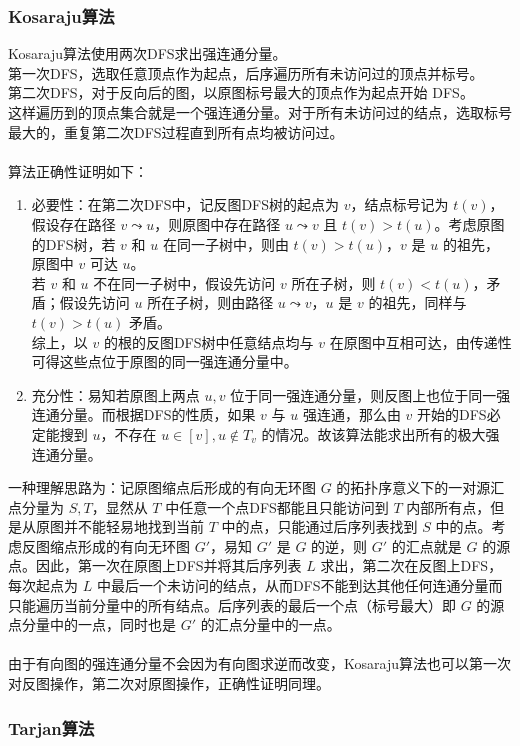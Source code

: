 \documentclass[12pt,a4paper]{article}
\begin{document}
\subsubsection{Kosaraju算法}
Kosaraju算法使用两次DFS求出强连通分量。\\
第一次DFS，选取任意顶点作为起点，后序遍历所有未访问过的顶点并标号。\\
第二次DFS，对于反向后的图，以原图标号最大的顶点作为起点开始 DFS。\\
这样遍历到的顶点集合就是一个强连通分量。对于所有未访问过的结点，选取标号最大的，重复第二次DFS过程直到所有点均被访问过。\\\\
算法正确性证明如下：
\begin{enumerate}
	\item 必要性：在第二次DFS中，记反图DFS树的起点为 $v$，结点标号记为 $t(v)$，假设存在路径 $v\leadsto u$，则原图中存在路径 $u\leadsto v$ 且 $t(v)>t(u)$。考虑原图的DFS树，若 $v$ 和 $u$ 在同一子树中，则由 $t(v)>t(u)$，$v$ 是 $u$ 的祖先，原图中 $v$ 可达 $u$。\\
	若 $v$ 和 $u$ 不在同一子树中，假设先访问 $v$ 所在子树，则 $t(v)<t(u)$，矛盾；假设先访问 $u$ 所在子树，则由路径 $u\leadsto v$，$u$ 是 $v$ 的祖先，同样与 $t(v)>t(u)$ 矛盾。\\
	综上，以 $v$ 的根的反图DFS树中任意结点均与 $v$ 在原图中互相可达，由传递性可得这些点位于原图的同一强连通分量中。
	\item 充分性：易知若原图上两点 $u,v$ 位于同一强连通分量，则反图上也位于同一强连通分量。而根据DFS的性质，如果 $v$ 与 $u$ 强连通，那么由 $v$ 开始的DFS必定能搜到 $u$，不存在 $u\in[v],u\notin T_v$ 的情况。故该算法能求出所有的极大强连通分量。
\end{enumerate}
一种理解思路为：记原图缩点后形成的有向无环图 $G$ 的拓扑序意义下的一对源汇点分量为 $S,T$，显然从 $T$ 中任意一个点DFS都能且只能访问到 $T$ 内部所有点，但是从原图并不能轻易地找到当前 $T$ 中的点，只能通过后序列表找到 $S$ 中的点。考虑反图缩点形成的有向无环图 $G'$，易知 $G'$ 是 $G$ 的逆，则 $G'$ 的汇点就是 $G$ 的源点。因此，第一次在原图上DFS并将其后序列表 $L$ 求出，第二次在反图上DFS，每次起点为 $L$ 中最后一个未访问的结点，从而DFS不能到达其他任何连通分量而只能遍历当前分量中的所有结点。后序列表的最后一个点（标号最大）即 $G$ 的源点分量中的一点，同时也是 $G'$ 的汇点分量中的一点。\\\\
由于有向图的强连通分量不会因为有向图求逆而改变，Kosaraju算法也可以第一次对反图操作，第二次对原图操作，正确性证明同理。
\subsubsection{Tarjan算法}
\end{document}
